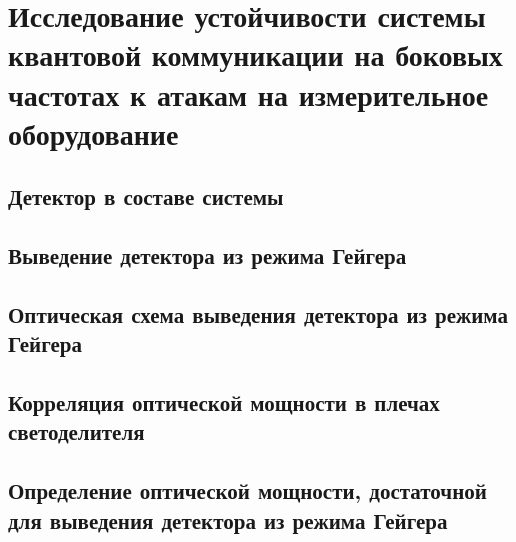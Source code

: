 \chapter{Исследование устойчивости системы квантовой коммуникации на боковых частотах к атакам на измерительное оборудование}  \label{ch:ch2}


\section{Детектор в составе системы} \label{sec:ch2/sec1}





\section{Выведение детектора из режима Гейгера} \label{sec:ch2/sec2}




\section{Оптическая схема выведения детектора из режима Гейгера} \label{sec:ch2/sec3}





\section{Корреляция оптической мощности в плечах светоделителя} \label{sec:ch2/sec4}




\section{Определение оптической мощности, достаточной для выведения детектора из режима Гейгера} \label{sec:ch2/sec5}



